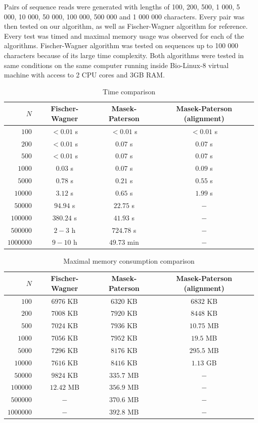 \documentclass[times, utf8, seminar, numeric]{fer}
\begin{document}
Pairs of sequence reads were generated with lengths of 100, 200, 500, 1 000, 5 000, 10 000, 50 000, 100 000, 500 000 and 1 000 000 characters. Every pair was then tested on our algorithm, as well as Fischer-Wagner algorithm for reference. Every test was timed and maximal memory usage was observed for each of the algorithms. Fischer-Wagner algorithm was tested on sequences up to 100 000 characters because of its large time complexity. Both algorithms were tested in same conditions on the same computer running inside Bio-Linux-8 virtual machine with access to 2 CPU cores and 3GB RAM.
\begin{table}[h]
\centering
\begin{tabular}{rccc}
$N$ & Fischer-Wagner & Masek-Paterson & Masek-Paterson (alignment)\\
\hline
$      100 $&$ < 0.01$ s&$ <0.01$ s&$ <0.01 $ s \\
$      200 $&$ < 0.01$ s&$ 0.07$ s&$ 0.07$ s \\
$      500 $&$ < 0.01$ s&$ 0.07$ s&$ 0.07$ s\\
$    1 000 $&$ 0.03$ s&$ 0.07$ s&$ 0.09$ s\\
$    5 000 $&$ 0.78$ s&$ 0.21$ s&$ 0.55$ s\\
$   10 000 $&$ 3.12$ s&$ 0.65$ s&$ 1.99$ s\\
$   50 000 $&$ 94.94$ s&$ 22.75$ s&$ - $\footnotemark[2]\\
$  100 000 $&$ 380.24$ s&$ 41.93$ s&$ - $\footnotemark[2]\\
$  500 000 $&$ 2 - 3$ h\footnotemark[1] &$ 724.78$ s&$ - $\footnotemark[2]\\
$1 000 000 $&$ 9 - 10$ h\footnotemark[1] &$ 49.73$ min&$ - $\footnotemark[2]\\
\end{tabular}
\caption{Time comparison}
\end{table}
\begin{table}[h]
\centering
\begin{tabular}{rccc}
$N$ & Fischer-Wagner & Masek-Paterson & Masek-Paterson (alignment) \\
\hline
$      100 $&$ 6976$ KB &$ 6320$ KB &$ 6832$ KB \\
$      200 $&$ 7008$ KB &$ 7920$ KB &$ 8448$ KB \\
$      500 $&$ 7024$ KB &$ 7936$ KB &$ 10.75$ MB \\
$    1 000 $&$ 7056$ KB &$ 7952$ KB &$ 19.5$ MB\\
$    5 000 $&$ 7296$ KB &$ 8176$ KB &$ 295.5$ MB\\
$   10 000 $&$ 7616$ KB &$ 8416$ KB &$ 1.13$ GB\\
$   50 000 $&$ 9824$ KB &$ 335.7$ MB&$ - $\footnotemark[2]\\
$  100 000 $&$ 12.42$ MB &$ 356.9$ MB&$ - $\footnotemark[2]\\
$  500 000 $&$ -$\footnotemark[1]&$ 370.6$ MB&$ - $\footnotemark[2]\\
$1 000 000 $&$ -$\footnotemark[1]&$ 392.8$ MB&$ - $\footnotemark[2]\\
\end{tabular}
\caption{Maximal memory consumption comparison}
\end{table}
\end{document}
